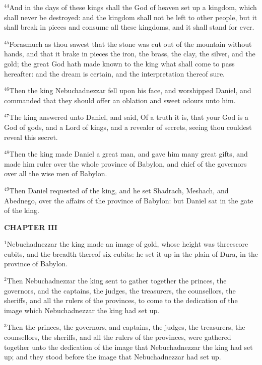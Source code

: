 \documentclass[12pt]{article}
\begin{document}
$^{44}$And in the days of these kings shall the God of heaven set up a
kingdom, which shall never be destroyed: and the kingdom shall not be
left to other people, but it shall break in pieces and consume all
these kingdoms, and it shall stand for ever.


$^{45}$Forasmuch as thou sawest that the stone was cut out of the
mountain without hands, and that it brake in pieces the iron, the
brass, the clay, the silver, and the gold; the great God hath made
known to the king what shall come to pass hereafter: and the dream is
certain, and the interpretation thereof sure.


$^{46}$Then the king Nebuchadnezzar fell upon his face, and worshipped
Daniel, and commanded that they should offer an oblation and sweet
odours unto him.


$^{47}$The king answered unto Daniel, and said, Of a truth it is, that
your God is a God of gods, and a Lord of kings, and a revealer of
secrets, seeing thou couldest reveal this secret.


$^{48}$Then the king made Daniel a great man, and gave him many great
gifts, and made him ruler over the whole province of Babylon, and
chief of the governors over all the wise men of Babylon.


$^{49}$Then Daniel requested of the king, and he set Shadrach, Meshach,
and Abednego, over the affairs of the province of Babylon: but Daniel
sat in the gate of the king.





\begin{center}
\textbf{\small CHAPTER III}
\end{center}
$^{1}$Nebuchadnezzar the king made an image of gold, whose height was
threescore cubits, and the breadth thereof six cubits: he set it up in
the plain of Dura, in the province of Babylon.


$^{2}$Then Nebuchadnezzar the king sent to gather together the princes,
the governors, and the captains, the judges, the treasurers, the
counsellors, the sheriffs, and all the rulers of the provinces, to
come to the dedication of the image which Nebuchadnezzar the king had
set up.


$^{3}$Then the princes, the governors, and captains, the judges, the
treasurers, the counsellors, the sheriffs, and all the rulers of the
provinces, were gathered together unto the dedication of the image
that Nebuchadnezzar the king had set up; and they stood before the
image that Nebuchadnezzar had set up.
\end{document}
